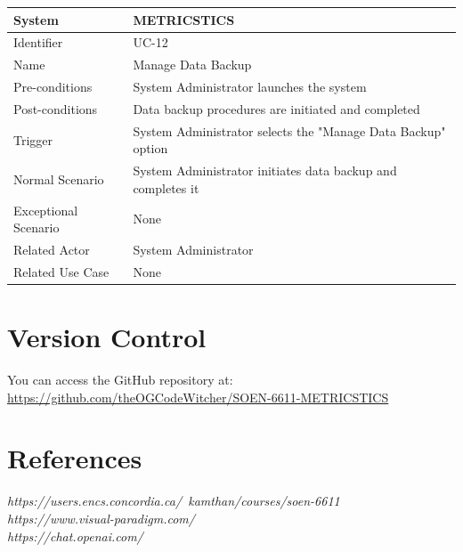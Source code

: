 \documentclass[letterpaper,12pt]{article}
\begin{document}
\begin{itemize}
\begin{tabular}{|p{1.45in}|p{3.65in}|}
    \hline
    System & METRICSTICS \\
    \hline
    Identifier & UC-12 \\
    \hline
    Name & Manage Data Backup \\
    \hline
    Pre-conditions & System Administrator launches the system\\
   \hline
    Post-conditions & Data backup procedures are initiated and completed\\
   \hline
    Trigger & System Administrator selects the "Manage Data Backup" option \\
    \hline
    Normal Scenario & System Administrator initiates data backup and completes it \\
    \hline
    Exceptional Scenario & None \\
    \hline
    Related Actor& System Administrator\\
    \hline
    Related Use Case & None \\
\hline
\end{tabular}
\end{itemize}
\section {Version Control}
You can access the GitHub repository at:\\
\href{https://github.com/theOGCodeWitcher/SOEN-6611-METRICSTICS}{https://github.com/theOGCodeWitcher/SOEN-6611-METRICSTICS}
\section{References}
\textit{https://users.encs.concordia.ca/~kamthan/courses/soen-6611} \\
\textit{https://www.visual-paradigm.com/} \\
\textit{https://chat.openai.com/}
\end{document}

